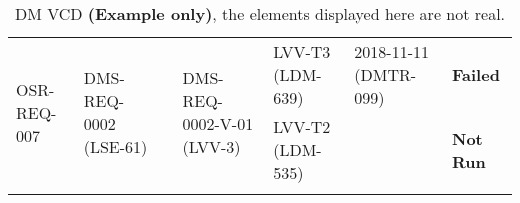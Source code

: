 \begin{longtable}[]{|p{1.5cm}|p{2.7cm}|p{1.5cm}|p{3.2cm}|p{1.5cm}|p{1.7cm}|p{1.5cm}|}
\multirow{2}{*}{
\tiny OSR-REQ-007} &
\multirow{2}{*}{
\begin{minipage}[t]{0.9\columnwidth}
{\small DMS-REQ-0002}\newline
{\scriptsize (LSE-61)}
\end{minipage}} &
\multirow{2}{*}{} &
\multirow{2}{*}{
\begin{minipage}[t]{0.9\columnwidth}
{\small DMS-REQ-0002-V-01}\newline
{\scriptsize (LVV-3)}
\end{minipage}} &
\begin{minipage}[t]{0.9\columnwidth}
{\small LVV-T3}\newline
{\scriptsize (LDM-639)}
\end{minipage} &
\begin{minipage}[t]{0.9\columnwidth}
{\small 2018-11-11}\newline
{\scriptsize (DMTR-099)}
\end{minipage} &
{\small \bf Failed} \\ \cline{5-7}
 & & & &
\begin{minipage}[t]{0.9\columnwidth}
{\small LVV-T2}\newline
{\scriptsize (LDM-535)}
\end{minipage} &
 &
{\small \bf Not Run}
\\\hline

\caption{DM VCD {\bf (Example only)}, the elements displayed here are not real.}
\label{tab:dmvcd}
\end{longtable}
